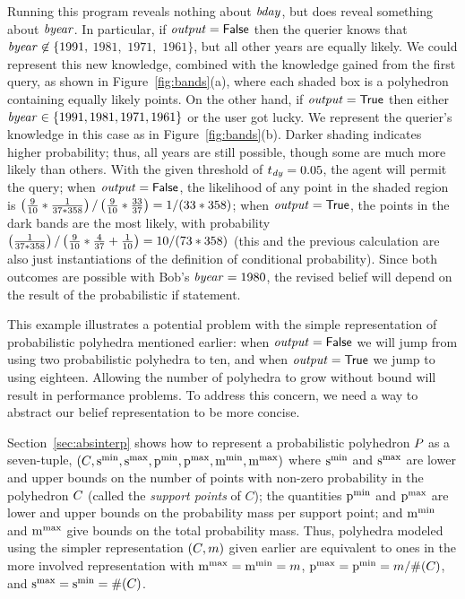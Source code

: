 Running this program reveals nothing about $\mathit{bday}$, but does
reveal something about $\mathit{byear}$.  In particular, if $\mathit{output}
= \mathsf{False}$ then the querier knows that $\mathit{byear} \not\in \{ 1991,$
$1981,$ $1971,$ $1961 \}$, but all other years are equally likely.  We
could represent this new knowledge, combined with the knowledge gained
from the first query, as shown in Figure~\ref{fig:bands}(a), where
each shaded box is a polyhedron containing equally likely points.  On
the other hand, if $\mathit{output} = \mathsf{True}$ then either $\mathit{byear}
\in \{ 1991, 1981, 1971, 1961 \}$ or the user got lucky.  We represent
the querier's knowledge in this case as in Figure~\ref{fig:bands}(b).
Darker shading indicates higher probability; thus, all years are still
possible, though some are much more likely than others.  With the
given threshold of $t_{\mathit{dy}} = 0.05$, the agent will permit the
query; when $\mathit{output} = \mathsf{False}$, the likelihood of any point in
the shaded region is
$\left( \frac{9}{10}*\frac{1}{37*358} \right)/\left( \frac{9}{10}*\frac{33}{37} \right)=1/(33
* 358) $; when $\mathit{output} = \mathsf{True}$, the points in the dark bands
are the most likely, with probability $
\left( \frac{1}{37*358} \right)/\left( \frac{9}{10}*\frac{4}{37} +
  \frac{1}{10} \right) = 10 / (73 * 358) $ (this and the previous calculation
are also just instantiations of the definition of conditional
probability). Since both outcomes are possible with Bob's $\mathit{byear}
= 1980$, the revised belief will depend on the result of the
probabilistic if statement.

This example illustrates a potential problem with the simple
representation of probabilistic polyhedra mentioned earlier: when
$\mathit{output} = \mathsf{False}$ we will jump from using two probabilistic
polyhedra to ten, and when $\mathit{output} = \mathsf{True}$ we jump to using
eighteen.  Allowing the number of polyhedra to grow without bound will
result in performance problems.  To address this concern, we need a way
to abstract our belief representation to be more concise.

Section~\ref{sec:absinterp} shows how to represent a probabilistic
polyhedron $P_{}$ as a seven-tuple, $(C_{},\mathrm{s}^\mathrm{min}_{}, \mathrm{s}^\mathrm{max}_{},
\mathrm{p}^\mathrm{min}_{}, \mathrm{p}^\mathrm{max}_{}, \mathrm{m}^\mathrm{min}_{}, \mathrm{m}^\mathrm{max}_{})$ where $\mathrm{s}^\mathrm{min}_{}$ and $ \mathrm{s}^\mathrm{max}_{}$
are lower and upper bounds on the number of points with non-zero
probability in the polyhedron $C_{}$ (called the \textit{support
  points} of $C$); the quantities $\mathrm{p}^\mathrm{min}_{} $ and $ \mathrm{p}^\mathrm{max}_{} $ are lower
and upper bounds on the probability mass per support point; and $
\mathrm{m}^\mathrm{min}_{} $ and $ \mathrm{m}^\mathrm{max}_{} $ give bounds on the total probability
mass. Thus, polyhedra modeled using the simpler representation
$(C_{},m)$ given earlier are equivalent to ones in the more
involved representation with $\mathrm{m}^\mathrm{max}_{} = \mathrm{m}^\mathrm{min}_{} = m$, $\mathrm{p}^\mathrm{max}_{} =
\mathrm{p}^\mathrm{min}_{} = m / \#(C_{})$, and $\mathrm{s}^\mathrm{max}_{} = \mathrm{s}^\mathrm{min}_{} =
\#(C_{})$.


